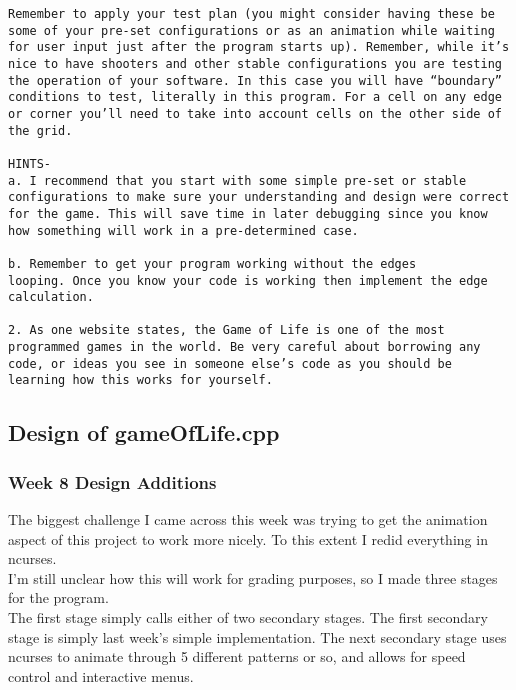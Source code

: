 \documentclass[11pt, oneside]{memoir}
\begin{document}
\begin{verbatim}
Remember to apply your test plan (you might consider having these be
some of your pre-set configurations or as an animation while waiting
for user input just after the program starts up). Remember, while it’s
nice to have shooters and other stable configurations you are testing
the operation of your software. In this case you will have “boundary”
conditions to test, literally in this program. For a cell on any edge
or corner you’ll need to take into account cells on the other side of
the grid. 

HINTS-
a. I recommend that you start with some simple pre-set or stable
configurations to make sure your understanding and design were correct
for the game. This will save time in later debugging since you know
how something will work in a pre-determined case. 

b. Remember to get your program working without the edges
looping. Once you know your code is working then implement the edge
calculation. 

2. As one website states, the Game of Life is one of the most
programmed games in the world. Be very careful about borrowing any
code, or ideas you see in someone else’s code as you should be
learning how this works for yourself.

\end{verbatim}

\subsection{Design of gameOfLife.cpp}

\subsubsection{Week 8 Design Additions}

The biggest challenge I came across this week was trying to get the
animation aspect of this project to work more nicely.  To this extent
I redid everything in ncurses.  \\

I'm still unclear how this will work for grading purposes, so I made
three stages for the program.  \\

The first stage simply calls either of two secondary stages.  The
first secondary stage is simply last week's simple implementation. The
next secondary stage uses ncurses to animate through 5 different
patterns or so, and allows for speed control and interactive menus.  \\
\end{document}
